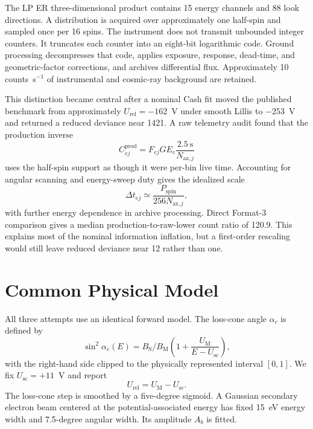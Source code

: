 \documentclass[11pt]{article}
\newcommand{\UM}{U_{\mathrm{M}}}
\newcommand{\Usc}{U_{\mathrm{sc}}}
\newcommand{\Urel}{U_{\mathrm{rel}}}
\newcommand{\BSBM}{B_{\mathrm{S}}/B_{\mathrm{M}}}
\begin{document}
The LP ER three-dimensional product contains 15 energy channels and 88 look
directions.  A distribution is acquired over approximately one half-spin and
sampled once per 16 spins.  The instrument does not transmit unbounded integer
counters.  It truncates each counter into an eight-bit logarithmic code.  Ground
processing decompresses that code, applies exposure, response, dead-time, and
geometric-factor corrections, and archives differential flux.  Approximately
10 counts~s$^{-1}$ of instrumental and cosmic-ray background are retained.

This distinction became central after a nominal Cash fit moved the published
benchmark from approximately $\Urel=-162$~V under smooth Lillis to
$-253$~V and returned a reduced deviance near 1421.  A raw telemetry audit found
that the production inverse
\begin{equation}
  C_{ej}^{\mathrm{prod}} = F_{ej} G E_e
  \frac{2.5~\mathrm{s}}{N_{\mathrm{az},j}}
\end{equation}
uses the half-spin support as though it were per-bin live time.  Accounting for
angular scanning and energy-sweep duty gives the idealized scale
\begin{equation}
  \Delta t_{ej} \simeq
  \frac{P_{\mathrm{spin}}}{256N_{\mathrm{az},j}},
\end{equation}
with further energy dependence in archive processing.  Direct Format-3
comparison gives a median production-to-raw-lower count ratio of 120.9.  This
explains most of the nominal information inflation, but a first-order rescaling
would still leave reduced deviance near 12 rather than one.

\section{Common Physical Model}

All three attempts use an identical forward model.  The loss-cone angle
$\alpha_c$ is defined by
\begin{equation}
  \sin^2 \alpha_c(E) = \BSBM
  \left(1 + \frac{\UM}{E-\Usc}\right),
  \label{eq:losscone}
\end{equation}
with the right-hand side clipped to the physically represented interval
$[0,1]$.  We fix $\Usc=+11$~V and report
\begin{equation}
  \Urel = \UM - \Usc.
\end{equation}
The loss-cone step is smoothed by a five-degree sigmoid.  A Gaussian secondary
electron beam centered at the potential-associated energy has fixed 15~eV
energy width and 7.5-degree angular width.  Its amplitude $A_b$ is fitted.
\end{document}
